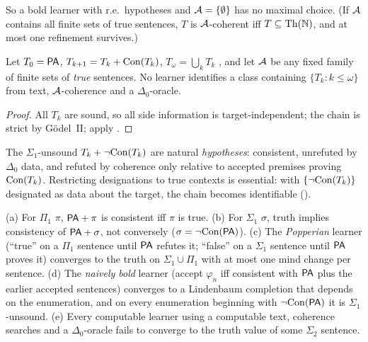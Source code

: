 So a bold learner with r.e.\ hypotheses and $\mathcal{A}=\{\emptyset\}$ has no maximal choice. (If $\mathcal{A}$ contains all finite sets of true sentences, $T$ is $\mathcal{A}$-coherent iff $T\subseteq\mathrm{Th}(\mathbb{N})$, and at most one refinement survives.)

\begin{theorem}\label{thm:coherence:turing}
Let $T_0=\mathsf{PA}$, $T_{k+1}=T_k+\mathrm{Con}(T_k)$, $T_\omega=\bigcup_kT_k$ \citep{turing1939systems,feferman1962transfinite}, and let $\mathcal{A}$ be any fixed family of finite sets of \emph{true} sentences. No learner identifies a class containing $\{T_k:k\le\omega\}$ from text, $\mathcal{A}$-coherence and a $\Delta_0$-oracle.
\end{theorem}

\begin{proof}
All $T_k$ are sound, so all side information is target-independent; the chain is strict by G\"odel~II; apply .
\end{proof}

The $\Sigma_1$-unsound $T_k+\neg\mathrm{Con}(T_k)$ are natural \emph{hypotheses}: consistent, unrefuted by $\Delta_0$ data, and refuted by coherence only relative to accepted premises proving $\mathrm{Con}(T_k)$. Restricting designations to true contexts is essential: with $\{\neg\mathrm{Con}(T_k)\}$ designated as data about the target, the chain becomes identifiable ().

\begin{theorem}\label{thm:coherence:popper}
\textup{(a)} For $\Pi_1$ $\pi$, $\mathsf{PA}+\pi$ is consistent iff $\pi$ is true. \textup{(b)} For $\Sigma_1$ $\sigma$, truth implies consistency of $\mathsf{PA}+\sigma$, not conversely ($\sigma=\neg\mathrm{Con}(\mathsf{PA})$).
\textup{(c)} The \emph{Popperian} learner (``true'' on a $\Pi_1$ sentence until $\mathsf{PA}$ refutes it; ``false'' on a $\Sigma_1$ sentence until $\mathsf{PA}$ proves it) converges to the truth on $\Sigma_1\cup\Pi_1$ with at most one mind change per sentence.
\textup{(d)} The \emph{naively bold} learner (accept $\varphi_n$ iff consistent with $\mathsf{PA}$ plus the earlier accepted sentences) converges to a Lindenbaum completion that depends on the enumeration, and on every enumeration beginning with $\neg\mathrm{Con}(\mathsf{PA})$ it is $\Sigma_1$-unsound.
\textup{(e)} Every computable learner using a computable text, coherence searches and a $\Delta_0$-oracle fails to converge to the truth value of some $\Sigma_2$ sentence.
\end{theorem}


